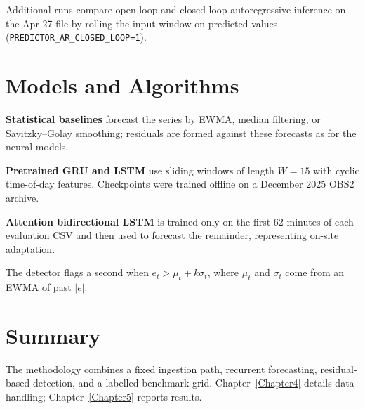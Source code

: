Additional runs compare open-loop and closed-loop autoregressive inference on the Apr-27 file by rolling the input window on predicted values (\texttt{PREDICTOR\_AR\_CLOSED\_LOOP=1}).

\section{Models and Algorithms}
\textbf{Statistical baselines} forecast the series by EWMA, median filtering, or Savitzky--Golay smoothing; residuals are formed against these forecasts as for the neural models.

\textbf{Pretrained GRU and LSTM} use sliding windows of length $W=15$ with cyclic time-of-day features. Checkpoints were trained offline on a December 2025 OBS2 archive.

\textbf{Attention bidirectional LSTM} is trained only on the first 62 minutes of each evaluation CSV and then used to forecast the remainder, representing on-site adaptation.

The detector flags a second when $e_t > \mu_t + k \sigma_t$, where $\mu_t$ and $\sigma_t$ come from an EWMA of past $|e|$.

\section{Summary}
The methodology combines a fixed ingestion path, recurrent forecasting, residual-based detection, and a labelled benchmark grid. Chapter~\ref{Chapter4} details data handling; Chapter~\ref{Chapter5} reports results.
